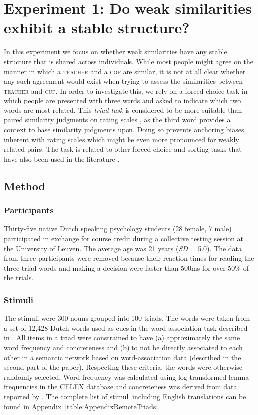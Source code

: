 \documentclass[doc]{apa6}
\newcommand{\stimulus}[1]{\textsc{#1}}
\begin{document}

\section{Experiment 1: Do weak similarities exhibit a stable structure?}


In this experiment we focus on whether weak similarities have any stable structure that is shared across individuals. While most people might agree on the manner in which a \stimulus{teacher} and a \stimulus{cop} are similar, it is not at all clear whether any such agreement would exist when trying to assess the similarities between \stimulus{teacher} and \stimulus{cup}. In order to investigate this, we rely on a forced choice task in which people are presented with three words and asked to indicate which two words are most related.
This {\it triad task} is considered to be more suitable than paired similarity judgments  on rating scales \parencite[e.g.][]{Dry2009,Hampton1998,DeDeyne2009}, as the third word provides a context to base similarity judgments upon. Doing so prevents anchoring biases inherent with rating scales \cite{Tversky1973} which might be even more pronounced for weakly related pairs. The task is related to other forced choice and sorting tasks that have also been used in the literature \parencite[e.g.,][]{Navarro2002,Storms2003}.



\subsection{Method}
\subsubsection{Participants} Thirty-five native Dutch speaking psychology students (28 female, 7 male) participated in exchange for course credit during a collective testing session at the University of Leuven. The average age was 21 years (\textit{SD} = 5.0). The data from three participants were removed because  their reaction times for reading the three triad words and making a decision were faster than 500ms for over 50\% of the trials.

\subsubsection{Stimuli}
The stimuli were 300 nouns grouped into 100 triads. The words were taken from a set of 12,428 Dutch words used as cues in the word association task described in \textcite{DeDeyne2013b}. All items in a triad were constrained to have  (a) approximately the same word frequency and concreteness and (b) to not be directly associated to each other in a semantic network based on word-association data (described in the second part of the paper). Respecting these criteria, the words were otherwise randomly selected. Word frequency was calculated using log-transformed lemma frequencies in the CELEX database \parencite{Baayen1993} and concreteness was derived from data reported by \textcite{DeDeyne2008b}. The complete list of stimuli including English translations can be found in Appendix~\ref{table:AppendixRemoteTriads}.
\end{document}
